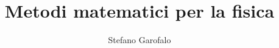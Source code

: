 \documentclass[a4paper,openany,titlepage]{book}
\author{Stefano Garofalo}
\title{Metodi matematici per la fisica}
\begin{document}
\maketitle
\tableofcontents

\toccontents











\end{document}
